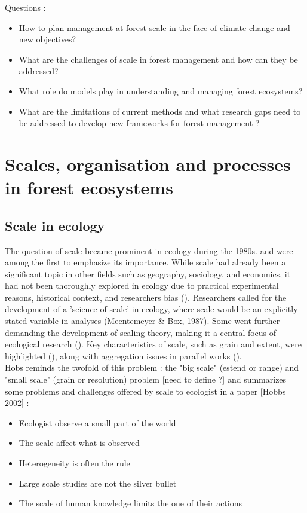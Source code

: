 \documentclass{article}
\begin{document}
Questions :
\begin{itemize}
    \item How to plan management at forest scale in the face of climate change and new objectives?
    \item What are the challenges of scale in forest management and how can they be addressed?
    \item What role do models play in understanding and managing forest ecosystems?
    \item What are the limitations of current methods and what research gaps need to be addressed to develop new frameworks for forest management ?
\end{itemize}

\section{Scales, organisation and processes in forest ecosystems}

\subsection{Scale in ecology}

The question of scale became prominent in ecology during the 1980s. \textcite{wiensSpatialScalingEcology1989} and \textcite{levinProblemPatternScale1992} were among the first to emphasize its importance. While scale had already been a significant topic in other fields such as geography, sociology, and economics, it had not been thoroughly explored in ecology due to practical experimental reasons, historical context, and researchers bias (\cite{wiensSpatialScalingEcology1989}). Researchers called for the development of a 'science of scale' in ecology, where scale would be an explicitly stated variable in analyses (Meentemeyer \& Box, 1987). Some went further demanding the development of scaling theory, making it a central focus of ecological research (\cite{wiensSpatialScalingEcology1989}). Key characteristics of scale, such as grain and extent, were highlighted (\cite{wiensSpatialScalingEcology1989}), along with aggregation issues in parallel works (\cite{gardnerRobustAnalysisAggregation1982}). \\

Hobs reminds the twofold of this problem : the "big scale" (estend or range) and "small scale" (grain or resolution) problem [need to define ?] and summarizes some problems and challenges offered by scale to ecologist in a paper [Hobbs 2002] :
\begin{itemize}
    \item Ecologist observe a small part of the world
    \item The scale affect what is observed
    \item Heterogeneity is often the rule
    \item Large scale studies are not the silver bullet
    \item The scale of human knowledge limits the one of their actions
\end{itemize}
\end{document}

